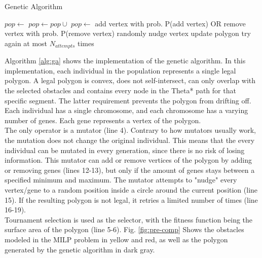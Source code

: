 \begin{algorithm}
\caption{Genetic Algorithm}
\label{alg:ga}
\begin{algorithmic}[1]
\State $pop \leftarrow $ 
\State $pop \leftarrow pop \cup $ 
\State {}
\State $pop \leftarrow $ 
\EndFor
\Return {}
\EndFunction
{}
\State add vertex with prob. P(add vertex)
\State OR remove vertex with prob. P(remove vertex)
\State randomly nudge  vertex
\State update polygon
\Else
\State try again at most $N_{attempts}$ times
\EndIf
\EndFor
\EndFor
\Return {}
\EndFunction
\end{algorithmic}
\end{algorithm}

Algorithm \ref{alg:ga} shows the implementation of the genetic algorithm. In this implementation, each individual in the population represents a single legal polygon. A legal polygon is convex, does not self-intersect, can only overlap with the selected obstacles and contains every node in the Theta* path for that specific segment. The latter requirement prevents the polygon from drifting off. Each individual has a single chromosome, and each chromosome has a varying number of genes. Each gene represents a vertex of the polygon.\\
The only operator is a mutator (line 4). Contrary to how mutators usually work, the mutation does not change the original individual. This means that the every individual can be mutated in every generation, since there is no risk of losing information. This mutator can add or remove vertices of the polygon by adding or removing genes (lines 12-13), but only if the amount of genes stays between a specified minimum and maximum. The mutator attempts to "nudge" every vertex/gene to a random position inside a circle around the current position (line 15). If the resulting polygon is not legal, it retries a limited number of times (line 16-19). \\
Tournament selection is used as the selector, with the fitness function being the surface area of the polygon (line 5-6). Fig. \ref{fig:pre-comp} Shows the obstacles modeled in the MILP problem in yellow and red, as well as the polygon generated by the genetic algorithm in dark gray.



